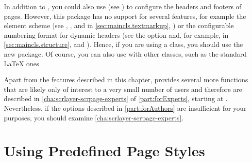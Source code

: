 In addition to ,
you could also use  (see
\cite{package:fancyhdr}) to configure the headers and footers of pages.
However, this package has no support for several \KOMAScript{} features,
for example the element scheme (see ,
, and
 in \autoref{sec:maincls.textmarkup},
) or the configurable numbering format
for dynamic headers (see the  option and,
for example,  in
\autoref{sec:maincls.structure},  and
). Hence, if you are using a
\KOMAScript{} class, you should use the new 
package.  Of course, you can also use
 with other classes, such as the standard \LaTeX{}
ones.

Apart from the features described in this chapter, 
provides several more functions that are likely only of interest to a very
small number of users and therefore are described in
\autoref{cha:scrlayer-scrpage-experts} of \autoref{part:forExperts}, starting
at . Nevertheless, if the options
described in \autoref{part:forAuthors} are insufficient for your purposes, you
should examine \autoref{cha:scrlayer-scrpage-experts}.




\section{Using Predefined Page Styles}

